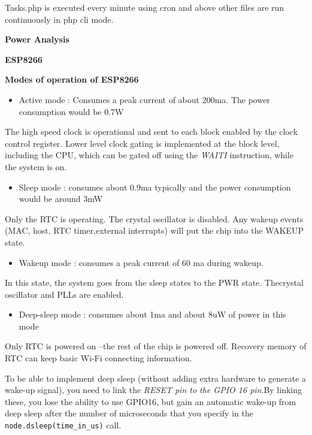 \documentclass[16pt]{article}
\begin{document}
Tasks.php is executed every minute using cron and above other files are
run continuously in php cli mode.



{\Large{\textbf{Power Analysis}}}

\textbf{ESP8266}

\textbf{Modes of operation of
ESP8266}

\begin{itemize}

\item
  Active mode : Consumes a peak current of about 200ma. The power
  consumption would be 0.7W
\end{itemize}

The high speed clock is operational and sent to each block enabled by
the clock control register. Lower level clock gating is implemented at
the block level, including the CPU, which can be gated off using the
\emph{WAITI} instruction, while the system is on.

\begin{itemize}

\item
  Sleep mode : consumes about 0.9ma typically and the power consumption
  would be around 3mW
\end{itemize}

Only the RTC is operating. The crystal oscillator is disabled. Any
wakeup events (MAC, host, RTC timer,external interrupts) will put the
chip into the WAKEUP state.

\begin{itemize}

\item
  Wakeup mode : consumes a peak current of 60 ma during wakeup.
\end{itemize}

In this state, the system goes from the sleep states to the PWR state.
Thecrystal oscillator and PLLs are enabled.

\begin{itemize}

\item
  Deep-sleep mode : consumes about 1ma and about 8uW of power in this
  mode
\end{itemize}

Only RTC is powered on --the rest of the chip is powered off. Recovery
memory of RTC can keep basic Wi-Fi connecting information.

To be able to implement deep sleep (without adding extra hardware to
generate a wake-up signal), you need to link the \emph{RESET pin to the
GPIO 16 pin}.By linking these, you lose the ability to use GPIO16, but
gain an automatic wake-up from deep sleep after the number of
microseconds that you specify in the \texttt{node.dsleep(time\_in\_us)}
call.
\end{document}

